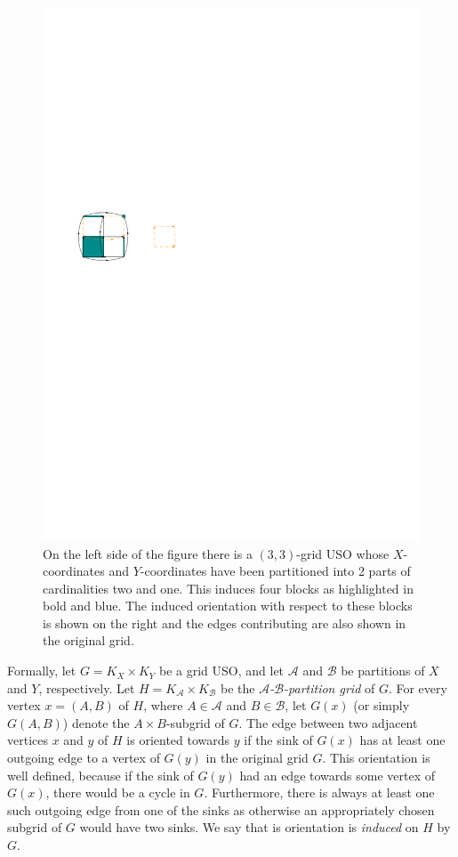 \documentclass[runningheads,a4paper]{llncs}
\newcommand{\A}{\ensuremath{\mathcal A}}
\newcommand{\B}{\ensuremath{\mathcal B}}
\begin{document}
  \begin{figure}[htbp] 
  	\centering
  	\includegraphics[scale=1.5]{induced_orientation_ex.pdf}
  	\caption{\small On the left side of the figure there is a $(3,3)$-grid USO whose $X$-coordinates and $Y$-coordinates have been partitioned into 2 parts of cardinalities two and one. This induces four blocks as highlighted in bold and blue. The induced orientation with respect to these blocks is shown on the right and the edges contributing are also shown in the original grid.} 
  	\label{fig:example_induced_orientation}
  \end{figure}

Formally, let $G = K_X \times K_Y$ be a grid USO,
and let $\A$ and $\B$ be partitions of $X$ and $Y$, respectively.
Let $H = K_\A \times K_\B$ be the \emph{$\A$-$\B$-partition grid} of $G$.
For every vertex $x = (A,B)$ of $H$, where $A\in \A$ and $B \in \B$, let $G(x)$ (or simply $G(A,B)$)
denote the $A \times B$-subgrid of $G$. 
The edge between two adjacent vertices $x$ and $y$ of $H$ is oriented towards $y$ if the sink of $G(x)$ has at least one outgoing edge to a vertex of $G(y)$ in the original grid $G$. 
This orientation is well defined, because if the sink of $G(y)$ had an edge towards some vertex of $G(x)$, there would be a cycle in $G$. 
Furthermore, there is always at least one such outgoing edge from one of the sinks as otherwise an appropriately chosen subgrid of $G$ would have two sinks. 
We say that is orientation is \emph{induced} on $H$ by $G$.
\end{document}
